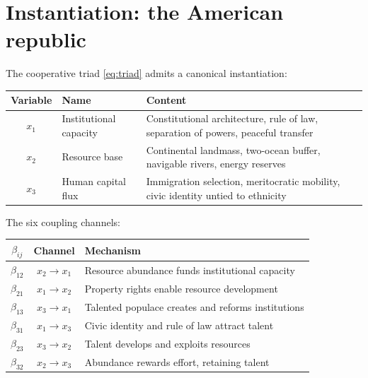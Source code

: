 \section{Instantiation: the American republic}\label{sec:america}

The cooperative triad \eqref{eq:triad} admits a canonical
instantiation:

\begin{center}
\renewcommand{\arraystretch}{1.25}
\begin{tabular}{@{}clp{6.5cm}@{}}
\toprule
\textbf{Variable} & \textbf{Name} & \textbf{Content} \\
\midrule
$x_1$ & Institutional capacity &
  Constitutional architecture, rule of law,
  separation of powers, peaceful transfer \\
$x_2$ & Resource base &
  Continental landmass, two-ocean buffer,
  navigable rivers, energy reserves \\
$x_3$ & Human capital flux &
  Immigration selection, meritocratic mobility,
  civic identity untied to ethnicity \\
\bottomrule
\end{tabular}
\end{center}

The six coupling channels:

\begin{center}
\renewcommand{\arraystretch}{1.25}
\begin{tabular}{@{}ccp{7cm}@{}}
\toprule
$\beta_{ij}$ & \textbf{Channel} & \textbf{Mechanism} \\
\midrule
$\beta_{12}$ & $x_2 \to x_1$ &
  Resource abundance funds institutional capacity \\
$\beta_{21}$ & $x_1 \to x_2$ &
  Property rights enable resource development \\
$\beta_{13}$ & $x_3 \to x_1$ &
  Talented populace creates and reforms institutions \\
$\beta_{31}$ & $x_1 \to x_3$ &
  Civic identity and rule of law attract talent \\
$\beta_{23}$ & $x_3 \to x_2$ &
  Talent develops and exploits resources \\
$\beta_{32}$ & $x_2 \to x_3$ &
  Abundance rewards effort, retaining talent \\
\bottomrule
\end{tabular}
\end{center}

